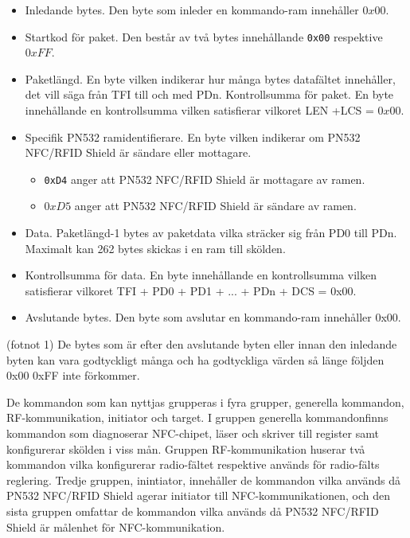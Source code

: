 \documentclass[11pt]{article}
\begin{document}

\begin{itemize}
\item Inledande bytes. Den byte som inleder en kommando-ram innehåller $0x00$.
\item Startkod för paket. Den består av två bytes innehållande \texttt{0x00} respektive $0xFF$.
\item Paketlängd. En byte vilken indikerar hur många bytes datafältet innehåller, det vill säga från TFI till och med PDn.
Kontrollsumma för paket. En byte innehållande en kontrollsumma vilken satisfierar vilkoret LEN +LCS = $0x00$.
\item Specifik PN532 ramidentifierare. En byte vilken indikerar om PN532 NFC/RFID Shield är sändare eller mottagare.
\begin{itemize}
\item \texttt{0xD4} anger att PN532 NFC/RFID Shield är mottagare av ramen.
\item $0xD5$ anger att PN532 NFC/RFID Shield är sändare av ramen.
\end{itemize}
\item Data. Paketlängd-1 bytes av paketdata vilka sträcker sig från PD0 till PDn. Maximalt kan 262 bytes skickas i en ram till skölden.
\item Kontrollsumma för data. En byte innehållande en kontrollsumma vilken satisfierar vilkoret TFI + PD0 + PD1 + ... + PDn + DCS = 0x00.
\item Avslutande bytes. Den byte som avslutar en kommando-ram innehåller 0x00.
\end{itemize}

(fotnot 1) De bytes som är efter den avslutande byten eller innan den inledande byten kan vara godtyckligt många och ha godtyckliga värden så länge följden 0x00 0xFF inte förkommer.

De kommandon som kan nyttjas grupperas i fyra grupper, generella kommandon, RF-kommunikation, initiator och target. I gruppen generella kommandonfinns kommandon som diagnoserar NFC-chipet, läser och skriver till register samt konfigurerar skölden i viss mån. Gruppen RF-kommunikation huserar två kommandon vilka konfigurerar radio-fältet respektive används för radio-fälts reglering. Tredje gruppen, inintiator, innehåller de kommandon vilka används då PN532 NFC/RFID Shield agerar initiator till NFC-kommunikationen, och den sista gruppen omfattar de kommandon vilka används då PN532 NFC/RFID Shield är målenhet för NFC-kommunikation.
\end{document}
